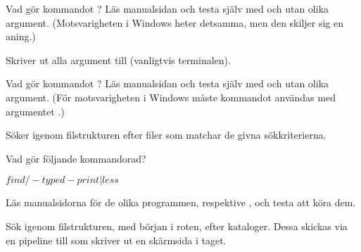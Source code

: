 \documentclass[a4paper,nocourse]{miunasgn}
\begin{document}
\begin{questions}
  \question\label{q:echo}
  Vad gör kommandot ?
  Läs manualsidan och testa själv med och utan olika argument.
  (Motsvarigheten i Windows heter detsamma, men den skiljer sig en aning.)
  \begin{solution}
    Skriver ut alla argument till  (vanligtvis terminalen).
  \end{solution}

  \question\label{q:find}
  Vad gör kommandot ?
  Läs manualsidan och testa själv med och utan olika argument.
  (För motsvarigheten i Windows måste kommandot  användas med 
  argumentet .)
  \begin{solution}
    Söker igenom filstrukturen efter filer som matchar de givna sökkriterierna.
  \end{solution}

  \question\label{q:findless}
  Vad gör följande kommandorad?
  \begin{terminal}
$ find / -type d -print | less
$
  \end{terminal}
  Läs manualsidorna för de olika programmen,  respektive 
  , och testa att köra dem.
  \begin{solution}
    Sök igenom filstrukturen, med början i roten, efter kataloger.
    Dessa skickas via en pipeline till  som skriver ut en 
    skärmsida i taget.
  \end{solution}

  \question\label{q:fs}


\end{questions}
\end{document}
